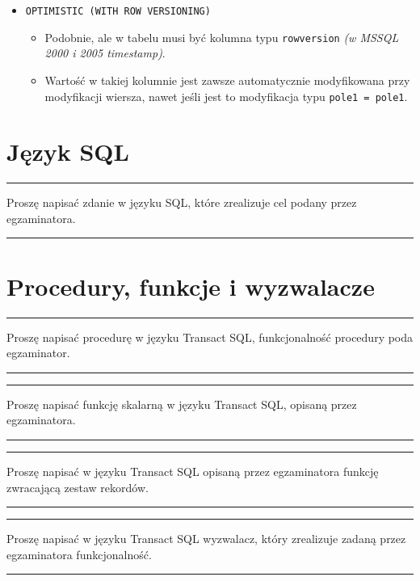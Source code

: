 \documentclass[a5paper,6pt]{article}
\newcommand{\horrule}[1]{\rule{\linewidth}{#1}}
\begin{document}
\begin{itemize}
        \item \texttt{OPTIMISTIC (WITH ROW VERSIONING)}
        \begin{itemize}
            \item Podobnie, ale w tabelu musi być kolumna typu
                  \texttt{rowversion} \textit{(w MSSQL 2000 i 2005 timestamp)}.
            \item Wartość w takiej kolumnie jest zawsze automatycznie
                  modyfikowana przy modyfikacji wiersza, nawet jeśli jest to
                  modyfikacja typu \texttt{pole1 = pole1}.
        \end{itemize}

    \end{itemize}



    \section{Język SQL} %
    \label{sec:jezyk_sql}

    \horrule{0.5pt}
    Proszę napisać zdanie w języku SQL, które zrealizuje cel podany przez
    egzaminatora.\\
    \horrule{0.5pt}



    \section{Procedury, funkcje i wyzwalacze} %
    \label{sec:procedury_funkcje_i_wyzwalacze}

    \horrule{0.5pt}
    Proszę napisać procedurę w języku Transact SQL, funkcjonalność procedury
    poda egzaminator.\\
    \horrule{0.5pt}

    \horrule{0.5pt}
    Proszę napisać funkcję skalarną w języku Transact SQL, opisaną przez egzaminatora.\\
    \horrule{0.5pt}

    \horrule{0.5pt}
    Proszę napisać w języku Transact SQL opisaną przez egzaminatora funkcję zwracającą zestaw rekordów.\\
    \horrule{0.5pt}

    \horrule{0.5pt}
    Proszę napisać w języku Transact SQL wyzwalacz, który zrealizuje zadaną
    przez egzaminatora funkcjonalność.\\
    \horrule{0.5pt}
\end{document}
